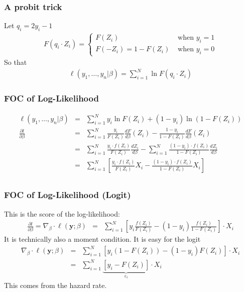 \begin{frame}
\frametitle{A probit trick}
Let $q_i = 2 y_i -1$
\begin{eqnarray*}
F(q_i \cdot Z_i) = 
\begin{cases}
F(Z_i)  &\mbox{ when } y_i=1 \\
F(-Z_i) = 1-F(Z_i)& \mbox{ when } y_i=0
\end{cases}
\end{eqnarray*}
So that 
\begin{eqnarray*}
\ell(y_1,\ldots, y_n | \beta) = \sum_{i=1}^N \ln F(q_i \cdot Z_i) 
\end{eqnarray*}
\end{frame}


\begin{frame}
\frametitle{FOC of Log-Likelihood}
\begin{eqnarray*}
\ell(y_1,\ldots,y_n | \beta) &=& \sum_{i=1}^N y_i \ln F(Z_i) + (1-y_i) \ln(1- F(Z_i)) \\
\frac{\partial l }{\partial \beta} &=& \sum_{i=1}^N \frac{y_i}{ F(Z_i)} \frac{ d F}{d \beta}(Z_i) - \frac{1-y_i}{1-F(Z_i)}  \frac{ d F}{d \beta} (Z_i)\\
 &=& \sum_{i=1}^N \frac{y_i \cdot f(Z_i) }{ F(Z_i)} \frac{ d Z_i}{d \beta} -  \sum_{i=1}^N \frac{(1-y_i)\cdot f(Z_i) }{1-F(Z_i)} \frac{ d Z_i}{d \beta} \\
 &=& \sum_{i=1}^N  \left[ \frac{y_i \cdot f(Z_i) }{ F(Z_i)} X_i -  \frac{(1-y_i)\cdot f(Z_i) }{1-F(Z_i)} X_i \right] \\
\end{eqnarray*}
\end{frame}

\begin{frame}
\frametitle{FOC of Log-Likelihood (Logit)}
This is the \alert{score} of the log-likelihood:
\begin{eqnarray*}
\frac{\partial l }{\partial \beta} = \nabla_{\beta} \cdot \ell(\mathbf{y}; \beta) &=&  \sum_{i=1}^N  \left[ y_i \frac{ f(Z_i) }{ F(Z_i)}  -  (1-y_i) \frac{f(Z_i) }{1-F(Z_i)} \right]  \cdot X_i 
\end{eqnarray*}
It is technically also a \alert{moment condition}. It is easy for the logit
\begin{eqnarray*}
 \nabla_{\beta} \cdot \ell(\mathbf{y}; \beta) &=&  \sum_{i=1}^N  \left[ y_i (1-F(Z_i)) -  (1-y_i) F(Z_i) \right] \cdot X_i \\
 &=&  \sum_{i=1}^N  \underbrace{\left[ y_i - F(Z_i) \right]}_{\varepsilon_i} \cdot X_i 
\end{eqnarray*}
This comes from the hazard rate.
\end{frame}

